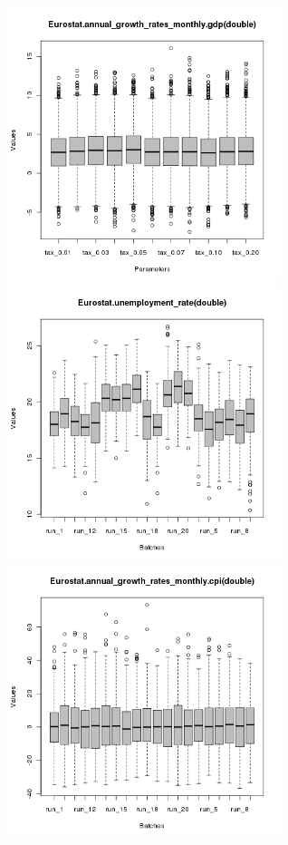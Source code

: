 \begin{figure}[ht!]
\centering\leavevmode
\begin{minipage}{17cm}
\centering\leavevmode
\includegraphics[width=8cm]{./batch/tax_0.08/Eurostat-gdp-batches.png}
\includegraphics[width=8cm]{./batch/tax_0.08/Eurostat-unemployment_rate-batches.png}\\
\includegraphics[width=8cm]{./batch/tax_0.08/Eurostat-cpi-batches.png}

\end{minipage}
\end{figure}
